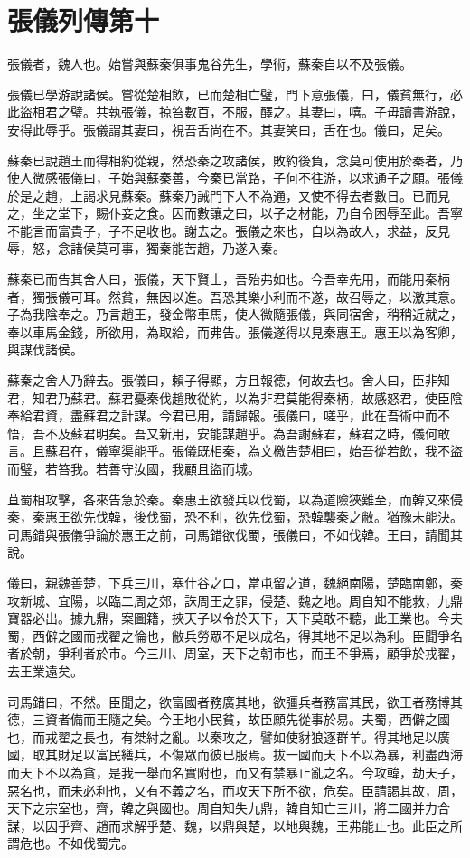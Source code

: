 \chapter{張儀列傳第十}

張儀者，魏人也。始嘗與蘇秦俱事鬼谷先生，學術，蘇秦自以不及張儀。

張儀已學游說諸侯。嘗從楚相飲，已而楚相亡璧，門下意張儀，曰，儀貧無行，必此盜相君之璧。共執張儀，掠笞數百，不服，醳之。其妻曰，嘻。子毋讀書游說，安得此辱乎。張儀謂其妻曰，視吾舌尚在不。其妻笑曰，舌在也。儀曰，足矣。

蘇秦已說趙王而得相約從親，然恐秦之攻諸侯，敗約後負，念莫可使用於秦者，乃使人微感張儀曰，子始與蘇秦善，今秦已當路，子何不往游，以求通子之願。張儀於是之趙，上謁求見蘇秦。蘇秦乃誡門下人不為通，又使不得去者數日。已而見之，坐之堂下，賜仆妾之食。因而數讓之曰，以子之材能，乃自令困辱至此。吾寧不能言而富貴子，子不足收也。謝去之。張儀之來也，自以為故人，求益，反見辱，怒，念諸侯莫可事，獨秦能苦趙，乃遂入秦。

蘇秦已而告其舍人曰，張儀，天下賢士，吾殆弗如也。今吾幸先用，而能用秦柄者，獨張儀可耳。然貧，無因以進。吾恐其樂小利而不遂，故召辱之，以激其意。子為我陰奉之。乃言趙王，發金幣車馬，使人微隨張儀，與同宿舍，稍稍近就之，奉以車馬金錢，所欲用，為取給，而弗告。張儀遂得以見秦惠王。惠王以為客卿，與謀伐諸侯。

蘇秦之舍人乃辭去。張儀曰，賴子得顯，方且報德，何故去也。舍人曰，臣非知君，知君乃蘇君。蘇君憂秦伐趙敗從約，以為非君莫能得秦柄，故感怒君，使臣陰奉給君資，盡蘇君之計謀。今君已用，請歸報。張儀曰，嗟乎，此在吾術中而不悟，吾不及蘇君明矣。吾又新用，安能謀趙乎。為吾謝蘇君，蘇君之時，儀何敢言。且蘇君在，儀寧渠能乎。張儀既相秦，為文檄告楚相曰，始吾從若飲，我不盜而璧，若笞我。若善守汝國，我顧且盜而城。

苴蜀相攻擊，各來告急於秦。秦惠王欲發兵以伐蜀，以為道險狹難至，而韓又來侵秦，秦惠王欲先伐韓，後伐蜀，恐不利，欲先伐蜀，恐韓襲秦之敝。猶豫未能決。司馬錯與張儀爭論於惠王之前，司馬錯欲伐蜀，張儀曰，不如伐韓。王曰，請聞其說。

儀曰，親魏善楚，下兵三川，塞什谷之口，當屯留之道，魏絕南陽，楚臨南鄭，秦攻新城、宜陽，以臨二周之郊，誅周王之罪，侵楚、魏之地。周自知不能救，九鼎寶器必出。據九鼎，案圖籍，挾天子以令於天下，天下莫敢不聽，此王業也。今夫蜀，西僻之國而戎翟之倫也，敝兵勞眾不足以成名，得其地不足以為利。臣聞爭名者於朝，爭利者於市。今三川、周室，天下之朝市也，而王不爭焉，顧爭於戎翟，去王業遠矣。

司馬錯曰，不然。臣聞之，欲富國者務廣其地，欲彊兵者務富其民，欲王者務博其德，三資者備而王隨之矣。今王地小民貧，故臣願先從事於易。夫蜀，西僻之國也，而戎翟之長也，有桀紂之亂。以秦攻之，譬如使豺狼逐群羊。得其地足以廣國，取其財足以富民繕兵，不傷眾而彼已服焉。拔一國而天下不以為暴，利盡西海而天下不以為貪，是我一舉而名實附也，而又有禁暴止亂之名。今攻韓，劫天子，惡名也，而未必利也，又有不義之名，而攻天下所不欲，危矣。臣請謁其故，周，天下之宗室也，齊，韓之與國也。周自知失九鼎，韓自知亡三川，將二國并力合謀，以因乎齊、趙而求解乎楚、魏，以鼎與楚，以地與魏，王弗能止也。此臣之所謂危也。不如伐蜀完。

